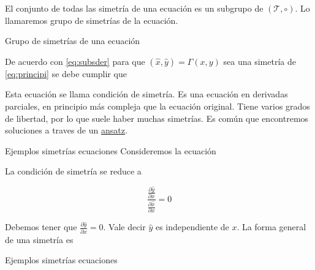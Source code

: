 \documentclass{article}
\renewcommand{\emph}[1]{\textcolor[rgb]{1,0,0}{#1}}
\begin{document}
 El conjunto de todas las simetría de una ecuación es un subgrupo de  $( \mathscr{T},\circ)$. Lo llamaremos \emph{grupo de simetrías} de la ecuación.

 







{Grupo de simetrías de una ecuación}

 De acuerdo con \eqref{eq:subsder} para que $(\hat{x},\hat{y})=\Gamma(x,y)$ sea una simetría de \eqref{eq:principi} se debe cumplir que

 Esta ecuación se llama \emph{condición de simetría}. Es una ecuación en derivadas parciales, en principio más compleja que la ecuación original. Tiene varios grados de libertad, por lo que suele haber muchas simetrías.  Es común que encontremos soluciones a  traves de un  \href{http://es.wikipedia.org/wiki/Ansatz}{ansatz}.





{Ejemplos simetrías ecuaciones }
Consideremos la ecuación

La condición de simetría se reduce a 

\[
\frac{\frac{\partial\hat{y}}{\partial x}}{\frac{\partial\hat{x}}{\partial x}}=0
\]

Debemos tener que $\frac{\partial\hat{y}}{\partial x}=0$. Vale decir $\hat{y}$ es independiente de $x$. La forma general de una simetría es





{Ejemplos simetrías ecuaciones }
\end{document}
